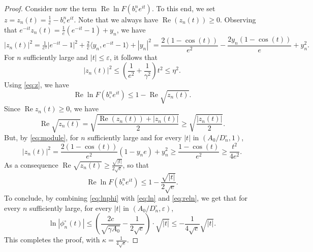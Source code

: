 \documentclass[AHL,XML,longabstracts,Unicode]{cedram}
\renewcommand{\Re}{\operatorname{Re}}
\def\bcn{b_{\circ}^{n}}
\def\phicn{\phi^{\circ}_{n}}
\def\Dcn{D^{\circ}_{n}}
\renewcommand{\epsilon}{\varepsilon}
\begin{document}
\begin{proof}
Consider now the term $\Re \ln F( \bcn e^{it})$.
To this end, we set $z=z_{n}(t)=\tfrac{1}{e}-\bcn e^{it}$.
Note that we always have $\Re(z_n(t)) \ge 0$.
Observing that $e^{-it} z_{n}(t)= \tfrac{1}{e}(e^{-it}-1)+y_n$, we have
\begin{equation}
  \label{eq:module} |z_{n}(t)|^{2}=  \tfrac{1}{e^2} \big|e^{-it}-1\big|^2
  +\tfrac{2}{e} \big\langle y_n, e^{-it}-1 \big\rangle +|y_n|^2
  = \frac{2(1-\cos(t))}{e^{2}} -\frac{2 y_{n}(1-\cos(t))}{e}+y_{n}^{2}.
\end{equation}
For $n$ sufficiently large and $|t| \leq \epsilon$, it follows that
\begin{equation}
\label{ineq:module} |z_{n}(t)|^{2} \leq  \left( \frac{1}{e^{2}} + \frac{1}{\gamma^{2}} \right)  t^{2} \leq \eta^{2}.
\end{equation}
Using \eqref{eq:z}, we have
\[\Re \ln F( \bcn e^{it}) \leq 1-   \Re \sqrt{z_{n}(t)}.\]
Since $\Re z_{n}(t) \ge 0$, we have
\[ \Re \sqrt{z_{n}(t)}=\sqrt{\frac{\Re(z_n(t))+|z_n(t)|}{2}} \ge \sqrt{\frac{|z_n(t)|}{2}}. \]
But, by \eqref{eq:module}, for $n$ sufficiently large and  for every $|t|$ in $(A_{0}/\Dcn,1)$,
\[|z_{n}(t)|^{2} = \frac{2(1-\cos(t))}{e^{2}} (1-y_{n} e)+y_{n}^{2} \geq \frac{1-\cos(t)}{e^{2}} \geq  \frac{t^{2}}{4e^{2}}.\]
As a consequence $\Re \sqrt{z_{n}(t)} \geq \frac{\sqrt{|t|}}{2\sqrt{e}}$, so that
\begin{equation}
\label{eq:reln}\Re \ln F( \bcn e^{it}) \leq 1- \frac{\sqrt{|t|}}{2\sqrt{e}}.
\end{equation}
To conclude, by combining \eqref{eq:lnphi} with \eqref{eq:ln} and \eqref{eq:reln},
we get that for every $n$ sufficiently large, for every $|t|$ in $(A_{0}/\Dcn, \epsilon)$,
\[\ln|\phicn(t)| \leq \left(  \frac{2c}{\sqrt{\gamma A_{0}}}- \frac{1}{2\sqrt{e}} \right) \cdot \sqrt{|t|} \leq -\frac{1}{4\sqrt{e}} \sqrt{|t|}.\]
This completes the proof, with $\kappa= \frac{1}{4\sqrt{e}}$.
\end{proof}
\end{document}
